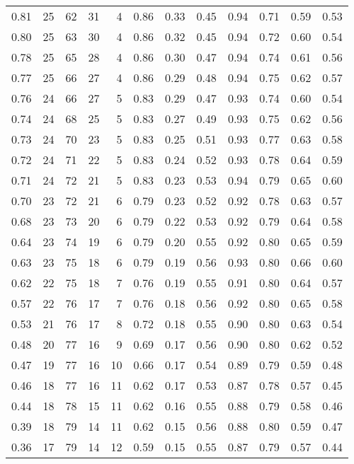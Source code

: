 \begin{table}[ht]
\begin{tabular}{r|rrrrrrrrrrr}
  0.81 & 25 & 62 & 31 & 4 & 0.86 & 0.33 & 0.45 & 0.94 & 0.71 & 0.59 & 0.53 \\ 
  0.80 & 25 & 63 & 30 & 4 & 0.86 & 0.32 & 0.45 & 0.94 & 0.72 & 0.60 & 0.54 \\ 
  0.78 & 25 & 65 & 28 & 4 & 0.86 & 0.30 & 0.47 & 0.94 & 0.74 & 0.61 & 0.56 \\ 
  0.77 & 25 & 66 & 27 & 4 & 0.86 & 0.29 & 0.48 & 0.94 & 0.75 & 0.62 & 0.57 \\ 
  0.76 & 24 & 66 & 27 & 5 & 0.83 & 0.29 & 0.47 & 0.93 & 0.74 & 0.60 & 0.54 \\ 
  0.74 & 24 & 68 & 25 & 5 & 0.83 & 0.27 & 0.49 & 0.93 & 0.75 & 0.62 & 0.56 \\ 
  0.73 & 24 & 70 & 23 & 5 & 0.83 & 0.25 & 0.51 & 0.93 & 0.77 & 0.63 & 0.58 \\ 
  0.72 & 24 & 71 & 22 & 5 & 0.83 & 0.24 & 0.52 & 0.93 & 0.78 & 0.64 & 0.59 \\ 
  0.71 & 24 & 72 & 21 & 5 & 0.83 & 0.23 & 0.53 & 0.94 & 0.79 & 0.65 & 0.60 \\ 
  0.70 & 23 & 72 & 21 & 6 & 0.79 & 0.23 & 0.52 & 0.92 & 0.78 & 0.63 & 0.57 \\ 
  0.68 & 23 & 73 & 20 & 6 & 0.79 & 0.22 & 0.53 & 0.92 & 0.79 & 0.64 & 0.58 \\ 
  0.64 & 23 & 74 & 19 & 6 & 0.79 & 0.20 & 0.55 & 0.92 & 0.80 & 0.65 & 0.59 \\ 
  0.63 & 23 & 75 & 18 & 6 & 0.79 & 0.19 & 0.56 & 0.93 & 0.80 & 0.66 & 0.60 \\ 
  0.62 & 22 & 75 & 18 & 7 & 0.76 & 0.19 & 0.55 & 0.91 & 0.80 & 0.64 & 0.57 \\ 
  0.57 & 22 & 76 & 17 & 7 & 0.76 & 0.18 & 0.56 & 0.92 & 0.80 & 0.65 & 0.58 \\ 
  0.53 & 21 & 76 & 17 & 8 & 0.72 & 0.18 & 0.55 & 0.90 & 0.80 & 0.63 & 0.54 \\ 
  0.48 & 20 & 77 & 16 & 9 & 0.69 & 0.17 & 0.56 & 0.90 & 0.80 & 0.62 & 0.52 \\ 
  0.47 & 19 & 77 & 16 & 10 & 0.66 & 0.17 & 0.54 & 0.89 & 0.79 & 0.59 & 0.48 \\ 
  0.46 & 18 & 77 & 16 & 11 & 0.62 & 0.17 & 0.53 & 0.87 & 0.78 & 0.57 & 0.45 \\ 
  0.44 & 18 & 78 & 15 & 11 & 0.62 & 0.16 & 0.55 & 0.88 & 0.79 & 0.58 & 0.46 \\ 
  0.39 & 18 & 79 & 14 & 11 & 0.62 & 0.15 & 0.56 & 0.88 & 0.80 & 0.59 & 0.47 \\ 
  0.36 & 17 & 79 & 14 & 12 & 0.59 & 0.15 & 0.55 & 0.87 & 0.79 & 0.57 & 0.44 \\ 

\end{tabular}
\end{table}
